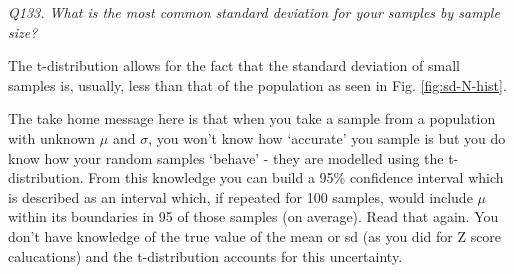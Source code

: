\documentclass[
  11pt,
  a4paper,
]{book}
\begin{document}
\emph{Q133. What is the most common standard deviation for your samples by sample size?}

The t-distribution allows for the fact that the standard deviation of small samples is, usually, less than that of the population as seen in Fig. \ref{fig:sd-N-hist}.

The take home message here is that when you take a sample from a population with unknown \(\mu\) and \(\sigma\), you won't know how `accurate' you sample is but you do know how your random samples `behave' - they are modelled using the t-distribution. From this knowledge you can build a 95\% confidence interval which is described as an interval which, if repeated for 100 samples, would include \(\mu\) within its boundaries in 95 of those samples (on average). Read that again. You don't have knowledge of the true value of the mean or sd (as you did for Z score calucations) and the t-distribution accounts for this uncertainty.
\end{document}
